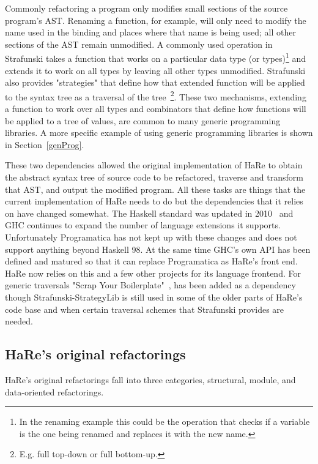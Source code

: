 Commonly refactoring a program only modifies small sections of the source program's AST. Renaming a function, for example, will only need to modify the name used in the binding and places where that name is being used; all other sections of the AST remain unmodified. A commonly used operation in Strafunski takes a function that works on a particular data type (or types)\footnote{In the renaming example this could be the operation that checks if a variable is the one being renamed and replaces it with the new name.} and extends it to work on all types by leaving all other types unmodified. Strafunski also provides "strategies" that define how that extended function will be applied to the syntax tree as a traversal of the tree~\citep{strafunski}\footnote{E.g. full top-down or full bottom-up.}. These two mechanisms, extending a function to work over all types and combinators that define how functions will be applied to a tree of values, are common to many generic programming libraries. A more specific example of using generic programming libraries is shown in Section~\ref{genProg}.

These two dependencies allowed the original implementation of HaRe to obtain the abstract syntax tree of source code to be refactored, traverse and transform that AST, and output the modified program. All these tasks are things that the current implementation of HaRe needs to do but the dependencies that it relies on have changed somewhat. The Haskell standard was updated in 2010~\citep{haskell2010} and GHC continues to expand the number of language extensions it supports. Unfortunately Programatica has not kept up with these changes and does not support anything beyond Haskell 98. At the same time GHC's own API has been defined and matured so that it can replace Programatica as HaRe's front end. HaRe now relies on this and a few other projects for its language frontend. For generic traversals "Scrap Your Boilerplate"~\citep{syb}, has been added as a dependency though Strafunski-StrategyLib is still used in some of the older parts of HaRe's code base and when certain traversal schemes that Strafunski provides are needed.
 
\subsection{HaRe's original refactorings}\label{origRefactorings}

HaRe's original refactorings fall into three categories, structural, module, and data-oriented refactorings.

